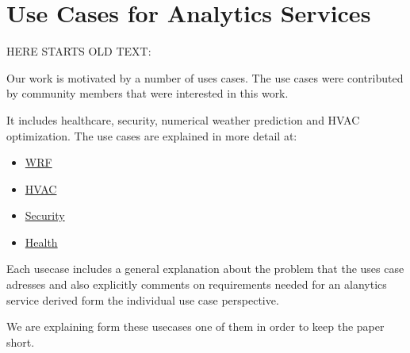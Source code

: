 

\section{Use Cases for Analytics Services}
\label{sec:usecases}







HERE STARTS OLD TEXT:

Our work is motivated by a number of uses cases. The use cases were
contributed by community members that were interested in this work.


It includes healthcare, security, numerical weather prediction and
HVAC optimization. The use cases are explained in more detail at:

\begin{itemize}
\item \href{https://github.com/cyberaide/NIST-analytics/blob/main/usecase/weather.tex}{WRF}
\item \href{https://github.com/cyberaide/NIST-analytics/blob/main/usecase/hvac.tex}{HVAC}
\item \href{https://github.com/cyberaide/NIST-analytics/blob/main/usecase/security.tex}{Security}
\item \href{https://github.com/cyberaide/NIST-analytics/blob/main/usecase/health.tex}{Health}
\end{itemize}

Each usecase includes a general explanation about the problem that the
uses case adresses and also explicitly comments on requirements needed
for an alanytics service derived form the individual use case
perspective.


We are explaining form these usecases one of them in order to keep the paper short. 

